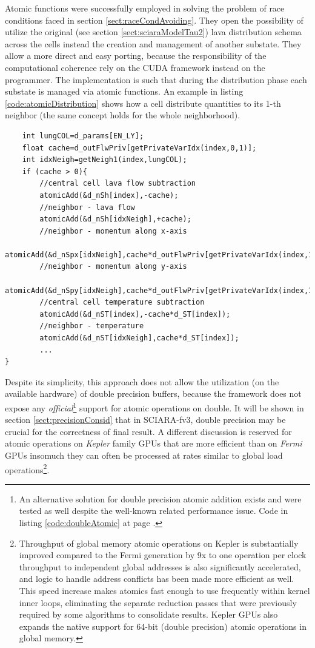 Atomic functions were successfully employed in solving the problem of race
conditions faced in section \ref{sect:raceCondAvoiding}. They open the
possibility of utilize the original (see section
\ref{sect:sciaraModelTau2}) lava distribution schema across the cells instead the creation and management of another substate. They allow a more
direct and easy porting, because the responsibility of the computational
coherence rely on the CUDA framework instead on the programmer.
The implementation is such that during the distribution phase each substate is
managed via atomic functions. An example in listing
\ref{code:atomicDistribution} shows how a cell distribute quantities to its
1-th neighbor (the same concept holds for the whole neighborhood).

\begin{lstlisting}
	int lungCOL=d_params[EN_LY];
	float cache=d_outFlwPriv[getPrivateVarIdx(index,0,1)];
	int idxNeigh=getNeigh1(index,lungCOL);
	if (cache > 0){
		//central cell lava flow subtraction 
		atomicAdd(&d_nSh[index],-cache);
		//neighbor - lava flow
		atomicAdd(&d_nSh[idxNeigh],+cache);
		//neighbor - momentum along x-axis
		atomicAdd(&d_nSpx[idxNeigh],cache*d_outFlwPriv[getPrivateVarIdx(index,1,1)]*COS_ALPHA_1);
		//neighbor - momentum along y-axis
		atomicAdd(&d_nSpy[idxNeigh],cache*d_outFlwPriv[getPrivateVarIdx(index,1,1)]*SIN_ALPHA_1);
		//central cell temperature subtraction 
		atomicAdd(&d_nST[index],-cache*d_ST[index]);
		//neighbor - temperature
		atomicAdd(&d_nST[idxNeigh],cache*d_ST[index]);
 		...
}
\end{lstlisting}

Despite its simplicity, this approach does not allow the utilization (on the
available hardware) of double precision buffers, because the framework does not
expose any \textit{official}\footnote{An alternative solution for double
precision atomic addition exists and were tested as well despite the well-known
related performance issue. Code in listing \ref{code:doubleAtomic} at page
\pageref{code:doubleAtomic}.} support  for atomic operations on double.
It will be shown in section \ref{sect:precisionConsid} that in SCIARA-fv3,
double precision may be crucial for the correctness of final result.
A different discussion is reserved for atomic operations on \textit{Kepler}
family GPUs that are more efficient than on \textit{Fermi} GPUs insomuch 
they can often be processed at rates similar to global load
operations\footnote{Throughput of global memory atomic operations on Kepler is
substantially improved compared to the Fermi generation by 9x to one operation
per clock throughput to independent global addresses is also significantly
accelerated, and logic to handle address conflicts has been made more efficient
as well.
This speed increase makes atomics fast enough to use frequently within kernel
inner loops, eliminating the separate reduction passes that were previously
required by some algorithms to consolidate results. Kepler GPUs also expands the
native support for 64-bit (double precision) atomic operations in global
memory.}.


